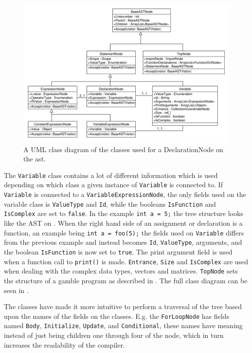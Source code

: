 \begin{figure}[!ht]
\centering
 \includegraphics[width=1\textwidth]{figures/ClassDiagrams/ASTDeclarationNodeMoreInfo.pdf} %
\caption{A UML class diagram of the classes used for a DeclarationNode on the \acrshort{ast}.}\label{image:ASTDecl}
\vspace{-15pt}
\end{figure}

The \texttt{Variable} class contains a lot of different information which is used depending on which class a given instance of \texttt{Variable} is connected to.
If \texttt{Variable} is connected to a \texttt{VariableExpressionNode}, the only fields used on the variable class is \texttt{ValueType} and \texttt{Id}, while the booleans \texttt{IsFunction} and \texttt{IsComplex} are set to \texttt{false}.
In the example \texttt{int a = 5;} the tree structure looks like the AST on .
When the right hand side of an assignment or declaration is a function, an example being \texttt{int a = foo(5);} the fields used on \texttt{Variable} differs from the previous example and instead becomes \texttt{Id}, \texttt{ValueType}, arguments, and the boolean \texttt{IsFunction} is now set to \texttt{true}.
The print argument field is used when a function call to \texttt{print()} is made. 
\texttt{Entrance}, \texttt{Size} and \texttt{IsComplex} are used when dealing with the complex data types, vectors and matrices.
\texttt{TopNode} sets the structure of a \gls{gamble} program as described in .
The full class diagram can be seen in .

The classes have made it more intuitive to perform a traversal of the tree based upon the names of the fields on the classes.
E.g. the \texttt{ForLoopNode} has fields named \texttt{Body}, \texttt{Initialize}, \texttt{Update}, and \texttt{Conditional}, these names have meaning instead of just being children one through four of the node, which in turn increases the readability of the compiler.

